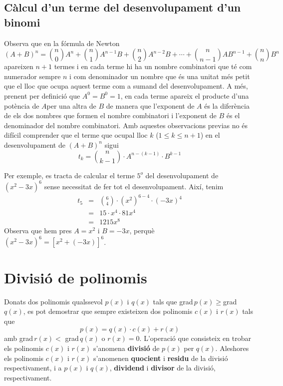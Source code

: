 \subsection{Càlcul d'un terme del desenvolupament d'un binomi}

Observa que en la fórmula de Newton\begin{equation*}
(A+B)^{n}=\binom{n}{0}A^{n}+\binom{n}{1}A^{n-1}B+\binom{n}{2}A^{n-2}B+\cdots
+\binom{n}{n-1}AB^{n-1}+\binom{n}{n}B^{n}
\end{equation*}apareixen $n+1$ termes i en cada terme hi ha un nombre
combinatori que té com numerador sempre $n$ i com denominador un nombre que és una unitat més petit que el lloc que ocupa aquest terme
com a sumand del desenvolupament. A més, prenent per definició que $A^{0}=B^{0}=1$, en cada terme apareix el producte d’una potència de $A $per una altra de $B$ de manera que l'exponent de $A$ és la diferència de
els dos nombres que formen el nombre combinatori i l'exponent de $B$ és el denominador del nombre combinatori. Amb aquestes observacions
previas no és difícil comprender que el terme que ocupal lloc $k$ ($1\leq k\leq n+1$) en el desenvolupament de $(A+B)^{n}$ sigui\begin{equation*}
t_{k}=\binom{n}{k-1}\cdot A^{n-(k-1)}\cdot B^{k-1}
\end{equation*}

Per exemple, es tracta de calcular el terme $5^{o}$ del desenvolupament de $(x^{2}-3x)^{6}$ sense necessitat de fer tot el desenvolupament. Així, tenim\begin{eqnarray*}
t_{5} &=&\binom{6}{4}\cdot \left( x^{2}\right) ^{6-4}\cdot \left( -3x\right)
^{4} \\
&=&15\cdot x^{4}\cdot 81x^{4} \\
&=&1215x^{8}
\end{eqnarray*}Observa que hem pres $A=x^{2}$ i $B=-3x$, perquè $(x^{2}-3x)^{6}=\left[
x^{2}+\left( -3x\right) \right] ^{6}$.

\section{Divisió de polinomis}

Donats dos polinomis qualssevol $p(x)$ i $q(x)$ tals que
grad\,$p(x)\geq $grad\,$q(x)$, es pot demostrar que sempre
existeixen dos polinomis $c(x)$ i $r(x)$ tals que\begin{equation*}
p(x)=q(x)\cdot c(x)+r(x)
\end{equation*}amb grad\,$r(x)<$ grad\,$q(x)$ o $r(x)=0$. L'operació que
consisteix en trobar els polinomis $c(x)$ i $r(x)$ s’anomena
\textbf{divisió} de $p(x)$ per $q(x)$. Aleshores els
polinomis $c(x)$ i $r(x)$ s'anomenen \textbf{quocient} i
\textbf{residu} de la divisió respectivament, i a $p(x)$ i
$q(x)$, \textbf{dividend} i \textbf{divisor} de la divisió,
respectivament.

